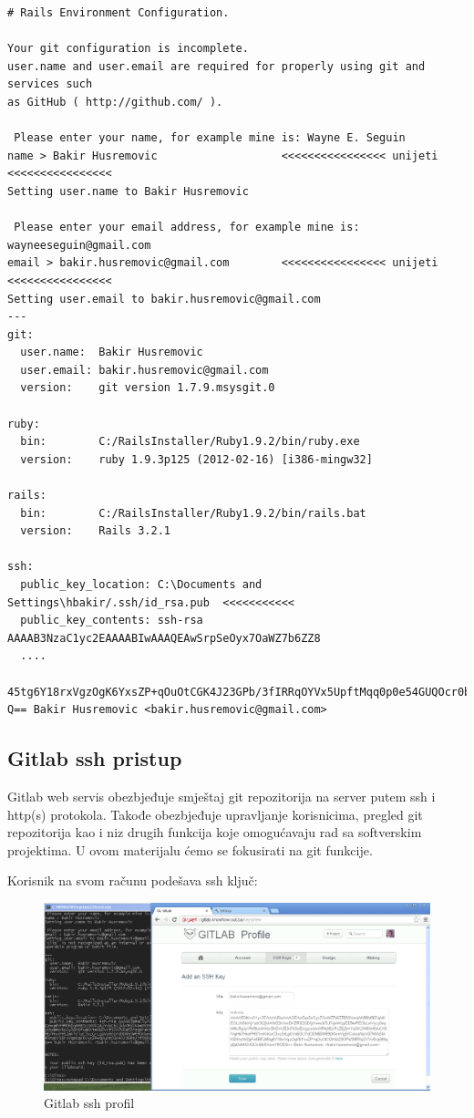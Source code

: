 \documentclass[times, utf8, seminar]{fit}
\begin{document}
\begin{lstlisting}
# Rails Environment Configuration.

Your git configuration is incomplete.
user.name and user.email are required for properly using git and services such
as GitHub ( http://github.com/ ).

 Please enter your name, for example mine is: Wayne E. Seguin
name > Bakir Husremovic                   <<<<<<<<<<<<<<<< unijeti <<<<<<<<<<<<<<<<
Setting user.name to Bakir Husremovic

 Please enter your email address, for example mine is: wayneeseguin@gmail.com
email > bakir.husremovic@gmail.com        <<<<<<<<<<<<<<<< unijeti <<<<<<<<<<<<<<<<
Setting user.email to bakir.husremovic@gmail.com
---
git:
  user.name:  Bakir Husremovic
  user.email: bakir.husremovic@gmail.com
  version:    git version 1.7.9.msysgit.0

ruby:
  bin:        C:/RailsInstaller/Ruby1.9.2/bin/ruby.exe
  version:    ruby 1.9.3p125 (2012-02-16) [i386-mingw32]

rails:
  bin:        C:/RailsInstaller/Ruby1.9.2/bin/rails.bat
  version:    Rails 3.2.1

ssh:
  public_key_location: C:\Documents and Settings\hbakir/.ssh/id_rsa.pub  <<<<<<<<<<<
  public_key_contents: ssh-rsa AAAAB3NzaC1yc2EAAAABIwAAAQEAwSrpSeOyx7OaWZ7b6ZZ8
  ....
  45tg6Y18rxVgzOgK6YxsZP+qOuOtCGK4J23GPb/3fIRRqOYVx5UpftMqq0p0e54GUQOcr0bS+/ooYNC
Q== Bakir Husremovic <bakir.husremovic@gmail.com>
\end{lstlisting}

\subsection{Gitlab ssh pristup}

Gitlab web servis obezbjeđuje smještaj git repozitorija na server putem ssh i http(s) protokola. 
Takođe obezbjeđuje upravljanje korisnicima, pregled git repozitorija kao i niz drugih funkcija koje omogućavaju rad sa softverskim projektima. 
U ovom materijalu ćemo se fokusirati na git funkcije. 

Korisnik na svom računu podešava ssh ključ:

\begin{figure}[H]
\centering
\includegraphics[width=15cm]{img/gitlab_ssh_profile.png}
\caption{Gitlab ssh profil}
\end{figure}
\end{document}
